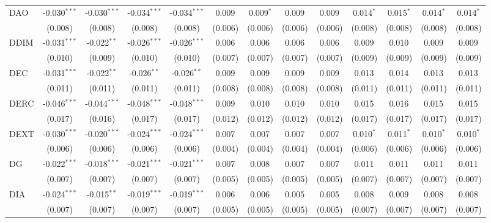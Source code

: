 \begin{table}[!htbp]
\begin{tabular}{@{\extracolsep{5pt}}lcccccccccccc}
 DAO & -0.030$^{***}$ & -0.030$^{***}$ & -0.034$^{***}$ & -0.034$^{***}$ & 0.009$^{}$ & 0.009$^{*}$ & 0.009$^{}$ & 0.009$^{}$ & 0.014$^{*}$ & 0.015$^{*}$ & 0.014$^{*}$ & 0.014$^{*}$ \\
  & (0.008) & (0.008) & (0.008) & (0.008) & (0.006) & (0.006) & (0.006) & (0.006) & (0.008) & (0.008) & (0.008) & (0.008) \\
 DDIM & -0.031$^{***}$ & -0.022$^{**}$ & -0.026$^{***}$ & -0.026$^{***}$ & 0.006$^{}$ & 0.006$^{}$ & 0.006$^{}$ & 0.006$^{}$ & 0.009$^{}$ & 0.010$^{}$ & 0.009$^{}$ & 0.009$^{}$ \\
  & (0.010) & (0.009) & (0.010) & (0.010) & (0.007) & (0.007) & (0.007) & (0.007) & (0.009) & (0.009) & (0.009) & (0.009) \\
 DEC & -0.031$^{***}$ & -0.022$^{**}$ & -0.026$^{**}$ & -0.026$^{**}$ & 0.009$^{}$ & 0.009$^{}$ & 0.009$^{}$ & 0.009$^{}$ & 0.013$^{}$ & 0.014$^{}$ & 0.013$^{}$ & 0.013$^{}$ \\
  & (0.011) & (0.011) & (0.011) & (0.011) & (0.008) & (0.008) & (0.008) & (0.008) & (0.011) & (0.011) & (0.011) & (0.011) \\
 DERC & -0.046$^{***}$ & -0.044$^{***}$ & -0.048$^{***}$ & -0.048$^{***}$ & 0.009$^{}$ & 0.010$^{}$ & 0.010$^{}$ & 0.010$^{}$ & 0.015$^{}$ & 0.016$^{}$ & 0.015$^{}$ & 0.015$^{}$ \\
  & (0.017) & (0.016) & (0.017) & (0.017) & (0.012) & (0.012) & (0.012) & (0.012) & (0.017) & (0.017) & (0.017) & (0.017) \\
 DEXT & -0.030$^{***}$ & -0.020$^{***}$ & -0.024$^{***}$ & -0.024$^{***}$ & 0.007$^{}$ & 0.007$^{}$ & 0.007$^{}$ & 0.007$^{}$ & 0.010$^{*}$ & 0.011$^{*}$ & 0.010$^{*}$ & 0.010$^{*}$ \\
  & (0.006) & (0.006) & (0.006) & (0.006) & (0.004) & (0.004) & (0.004) & (0.004) & (0.006) & (0.006) & (0.006) & (0.006) \\
 DG & -0.022$^{***}$ & -0.018$^{***}$ & -0.021$^{***}$ & -0.021$^{***}$ & 0.007$^{}$ & 0.008$^{}$ & 0.007$^{}$ & 0.007$^{}$ & 0.011$^{}$ & 0.011$^{}$ & 0.011$^{}$ & 0.011$^{}$ \\
  & (0.007) & (0.007) & (0.007) & (0.007) & (0.005) & (0.005) & (0.005) & (0.005) & (0.007) & (0.007) & (0.007) & (0.007) \\
 DIA & -0.024$^{***}$ & -0.015$^{**}$ & -0.019$^{***}$ & -0.019$^{***}$ & 0.006$^{}$ & 0.006$^{}$ & 0.005$^{}$ & 0.005$^{}$ & 0.008$^{}$ & 0.009$^{}$ & 0.008$^{}$ & 0.008$^{}$ \\
  & (0.007) & (0.007) & (0.007) & (0.007) & (0.005) & (0.005) & (0.005) & (0.005) & (0.007) & (0.007) & (0.007) & (0.007) \\

\end{tabular}
\end{table}
